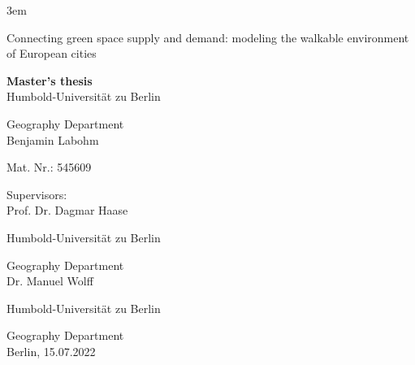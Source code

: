 \documentclass[10pt]{article}
\begin{document}
\emergencystretch 3em
\onecolumn


{\center
\vspace*{5cm}
{\Huge Connecting green space supply and demand: modeling the walkable environment of European cities}
\par\bigskip
\Large{
\textbf{Master's thesis}\\
Humbold-Universit\"at zu Berlin

Geography Department
\\
Benjamin Labohm

Mat. Nr.: 
545609
\vfill
}
}
\large{


Supervisors: \\
Prof. Dr. Dagmar Haase

Humbold-Universit\"at zu Berlin

Geography Department\\


Dr. Manuel Wolff

Humbold-Universit\"at zu Berlin

Geography Department \\

Berlin, 15.07.2022
}
\end{document}

